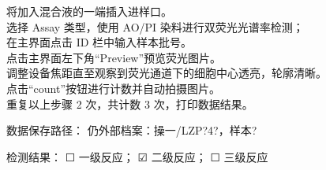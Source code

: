 \documentclass[UTF8,10pt,a4paper,fontset=fandol]{ctexart}
\newcommand{\fieldvalue}[1]{#1}
\newcommand{\handwritten}[1]{#1}
\newcommand{\checkboxfield}[1]{\ifstrequal{#1}{checked}{☑}{\ifstrequal{#1}{unclear}{?}{☐}}}
\begin{document}
\medskip

\noindent
将加入混合液的一端插入进样口。\\
选择 Assay 类型，使用 AO/PI 染料进行双荧光光谱率检测；\\
在主界面点击 ID 栏中输入样本批号。\\
点击主界面左下角“Preview”预览荧光图片。\\
调整设备焦距直至观察到荧光通道下的细胞中心透亮，轮廓清晰。\\
点击“count”按钮进行计数并自动拍摄图片。\\
重复以上步骤 2 次，共计数 3 次，打印数据结果。

\medskip

\noindent
数据保存路径：
\fieldvalue{\handwritten{仍外部档案：操一/LZP?4?，样本?}}

\medskip

\noindent
检测结果：
\fieldvalue{\checkboxfield{unchecked}} 一级反应；
\fieldvalue{\checkboxfield{checked}} 二级反应；
\fieldvalue{\checkboxfield{unchecked}} 三级反应
\end{document}

